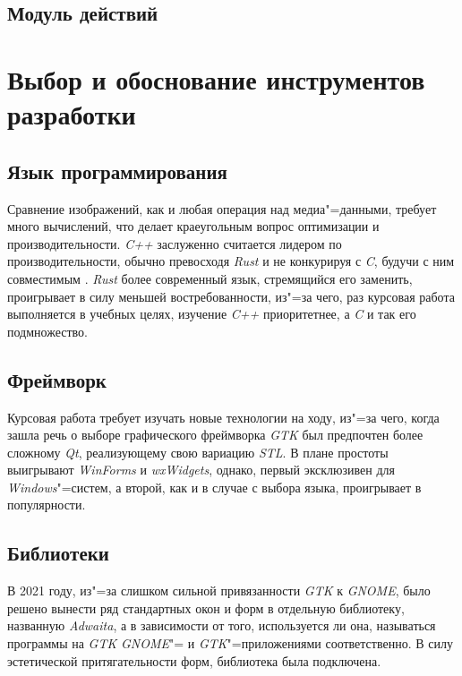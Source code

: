 \subsection{Модуль действий}



\section{Выбор и обоснование инструментов разработки}

\subsection{Язык программирования}
Сравнение изображений, как и любая операция над медиа"=данными, требует много
вычислений, что делает краеугольным вопрос оптимизации и производительности.
\textit{C++} заслуженно считается лидером по производительности, обычно
превосходя \textit{Rust} и не конкурируя с \textit{C}, будучи с ним совместимым
\cite{benchmarksgame}. \textit{Rust} более современный язык, стремящийся его
заменить, проигрывает в силу меньшей востребованности, из"=за чего, раз курсовая
работа выполняется в учебных целях, изучение \textit{C++} приоритетнее, а
\textit{C} и так его подмножество.

\subsection{Фреймворк}
Курсовая работа требует изучать новые технологии на ходу, из"=за чего, когда
зашла речь о выборе графического фреймворка \textit{GTK} был предпочтен более
сложному \textit{Qt}, реализующему свою вариацию \textit{STL}. В плане простоты
выигрывают \textit{WinForms} и \textit{wxWidgets}, однако, первый эксклюзивен
для \textit{Windows}"=систем, а второй, как и в случае с выбора языка,
проигрывает в популярности.

\subsection{Библиотеки}
В 2021 году, из"=за слишком сильной привязанности \textit{GTK} к \textit{GNOME},
было решено вынести ряд стандартных окон и форм в отдельную библиотеку,
названную \textit{Adwaita}, а в зависимости от того, используется ли она,
называться программы на \textit{GTK} \textit{GNOME}"= и
\textit{GTK}"=приложениями соответственно. В силу эстетической притягательности
форм, библиотека была подключена.

